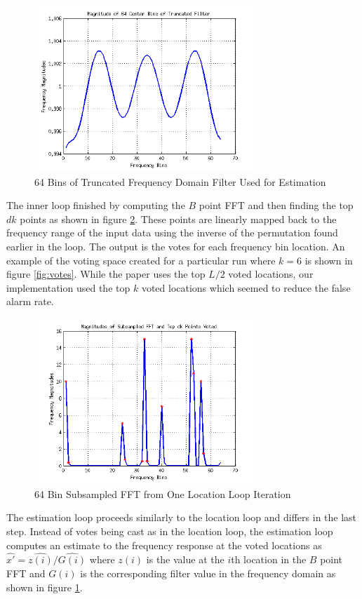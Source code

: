 \documentclass[journal]{IEEEtran}
\begin{document}
\begin{figure}[h]
\centering
\includegraphics[width=3.3in]{../images/filter_freq.png}
\caption{64 Bins of Truncated Frequency Domain Filter Used for Estimation}
\label{fig:filter_freq}
\end{figure}

\par The inner loop finished by computing the \(B\) point FFT and then finding the top \(dk\) points as shown in figure \ref{fig:z_hat}. These points are linearly mapped back to the frequency range of the input data using the inverse of the permutation found earlier in the loop. The output is the votes for each frequency bin location. An example of the voting space created for a particular run where \(k=6\) is shown in figure \ref{fig:votes}. While the paper uses the top \(L/2\) voted locations, our implementation used the top \(k\) voted locations which seemed to reduce the false alarm rate.

\begin{figure}[h]
\centering
\includegraphics[width=3.3in]{../images/z_hat.png}
\caption{64 Bin Subsampled FFT from One Location Loop Iteration}
\label{fig:z_hat}
\end{figure}

\par The estimation loop proceeds similarly to the location loop and differs in the last step. Instead of votes being cast as in the location loop, the estimation loop computes an estimate to the frequency response at the voted locations as \(\hat{x'}= \hat{z(i)} / \hat{G(i)}\) where \(z(i)\) is the value at the \(i\)th location in the \(B\) point FFT and \(G(i)\) is the corresponding filter value in the frequency domain as shown in figure \ref{fig:filter_freq}.
\end{document}

